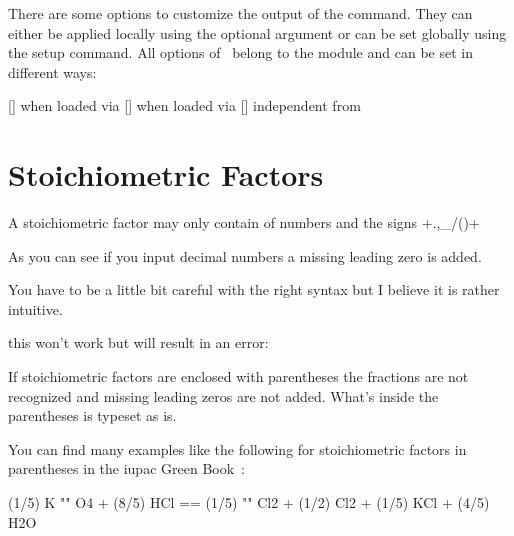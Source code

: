 \documentclass[load-preamble+]{cnltx-doc}
\begin{document}
There are some options to customize the output of the  command.  They
can either be applied locally using the optional argument or can be set
globally using the setup command.  All options of \chemformula\ belong to the
module  and can be set in different ways:
\begin{commands}
  []
    when loaded via \chemmacros
  []
    when loaded via \chemmacros
  []
    independent from \chemmacros
\end{commands}

\section{Stoichiometric Factors}
A stoichiometric factor may only contain of numbers and the signs
\verbcode+.,_/()+
\begin{example}
   \par

  % decimals:
   \par

   \par
 
\end{example}

As you can see if you input decimal numbers a missing leading zero is added.

You have to be a little bit careful with the right syntax but I believe it is
rather intuitive.
\begin{sourcecode}
  this won't work but will result in an error: 
\end{sourcecode}

If stoichiometric factors are enclosed with parentheses the fractions are not
recognized and missing leading zeros are not added.  What's inside the
parentheses is typeset as is.
\begin{example}
    
\end{example}
You can find many examples like the following for stoichiometric factors in
parentheses in the \acs{iupac} Green Book~\cite{iupac:greenbook}:
\begin{reaction*}
 (1/5) K "" O4 + (8/5) HCl == (1/5) "" Cl2 + (1/2) Cl2 + (1/5) KCl + (4/5) H2O
\end{reaction*}
\end{document}
